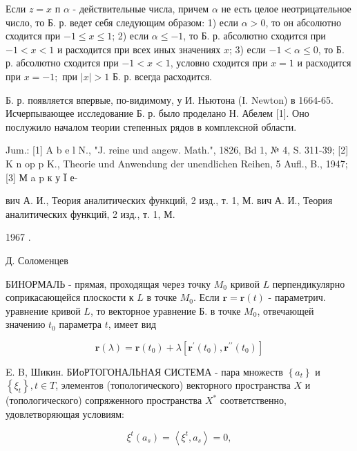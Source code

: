 \documentclass[10pt]{article}
\begin{document}
Если $z=x$ п $\alpha$ - действительные числа, причем $\alpha$ не есть целое неотрицательное число, то Б. р. ведет себя следующим образом: 1) если $\alpha>0$, то он абсолютно сходится при $-1 \leqslant x \leqslant 1$; 2) если $\alpha \leqslant-1$, то Б. р. абсолютно сходится при $-1<x<1$ и расходится при всех иных значениях $x$; 3) если $-1<\alpha \leqslant 0$, то Б. р. абсолютно сходится при $-1<x<1$, условно сходится при $x=1$ и расходится при $x=-1 ;$ при $|x|>1$ Б. р. всегда расходится.



Б. р. появляется впервые, по-видимому, у И. Ньютона (I. Newton) в 1664-65. Исчерпывающее исследование Б. р. было проделано Н. Абелем [1]. Оно послужило началом теории степенных рядов в комплексной области.



Jum.: [1] A b e l N., "J. reine und angew. Math.", 1826, Bd 1, № 4, S. 311-39; [2] K n op p K., Theorie und Anwendung der unendlichen Reihen, 5 Aufl., B., 1947; [3] М a p к у Ï е-

вич А. И., Теория аналитических функций, 2 изд., т. 1, М. вич А. И., Теория аналитических функций, 2 изд., т. 1, М.

1967 .

Д. Соломенцев



БИНОРМАЛЬ - прямая, проходящая через точку $M_{0}$ кривой $L$ перпендикулярно соприкасающейся плоскости к $L$ в точке $M_{0}$. Если $\boldsymbol{r}=\boldsymbol{r}(t)$ - параметрич. уравнение кривой $L$, то векторное уравнение Б. в точке $M_{0}$, отвечающей значению $t_{0}$ параметра $t$, имеет вид



\[

\boldsymbol{r}(\lambda)=\boldsymbol{r}\left(t_{0}\right)+\lambda\left[\boldsymbol{r}^{\prime}\left(t_{0}\right), \boldsymbol{r}^{\prime \prime}\left(t_{0}\right)\right]

\]



E. B, Шикин. БИоРТОГОНАЛЬНАЯ СИСТЕМА - пара множеств $\left\{a_{t}\right\}$ и $\left\{\xi_{t}\right\}, t \in T$, элементов (топологического) векторного пространства $X$ и (топологического) сопряженного пространства $X^{*}$ соответственно, удовлетворяющая условиям:



\[

\xi^{t}\left(a_{s}\right)=\left\langle\xi^{t}, a_{s}\right\rangle=0,

\]
\end{document}
